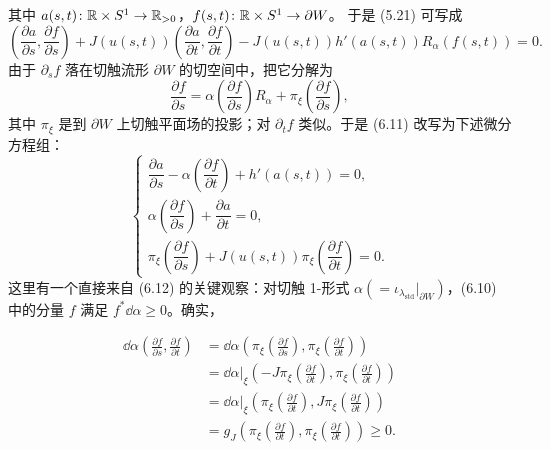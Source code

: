 其中 $a(s,t)\colon\mathbb{R}\times S^1\to\mathbb{R}_{>0}$，$f(s,t)\colon\mathbb{R}\times S^1\to\partial W$。
于是 (5.21) 可写成
\begin{equation}\tag{6.11}
  \left(\frac{\partial a}{\partial s},\frac{\partial f}{\partial s}\right)
  +J(u(s,t))\left(\frac{\partial a}{\partial t},\frac{\partial f}{\partial t}\right)
  -J(u(s,t))h'(a(s,t))R_\alpha(f(s,t))=0.
\end{equation}
由于 $\partial_s f$ 落在切触流形 $\partial W$ 的切空间中，把它分解为
\[
  \frac{\partial f}{\partial s}
  =\alpha\left(\frac{\partial f}{\partial s}\right)R_\alpha
  +\pi_\xi\left(\frac{\partial f}{\partial s}\right),
\]
其中 $\pi_\xi$ 是到 $\partial W$ 上切触平面场的投影；对 $\partial_t f$ 类似。于是
(6.11) 改写为下述微分方程组：
\begin{equation}\tag{6.12}
  \begin{cases}
    \dfrac{\partial a}{\partial s}
    -\alpha\left(\dfrac{\partial f}{\partial t}\right)+h'(a(s,t))=0,\\[8pt]
    \alpha\left(\dfrac{\partial f}{\partial s}\right)
    +\dfrac{\partial a}{\partial t}=0,\\[8pt]
    \pi_\xi\left(\dfrac{\partial f}{\partial s}\right)
    +J(u(s,t))\pi_\xi\left(\dfrac{\partial f}{\partial t}\right)=0.
  \end{cases}
\end{equation}
这里有一个直接来自 (6.12) 的关键观察：对切触 1-形式
$\alpha(=\iota_{\lambda_{\mathrm{std}}}|_{\partial W})$，(6.10) 中的分量 $f$ 满足
$f^*\dd\alpha\ge0$。确实，

\begin{align*}
  \dd\alpha\left(\frac{\partial f}{\partial s},\frac{\partial f}{\partial t}\right)
  &=\dd\alpha\left(\pi_\xi\left(\frac{\partial f}{\partial s}\right),
    \pi_\xi\left(\frac{\partial f}{\partial t}\right)\right)\\
  &=\dd\alpha|_\xi\left(-J\pi_\xi\left(\frac{\partial f}{\partial t}\right),
    \pi_\xi\left(\frac{\partial f}{\partial t}\right)\right)\\
  &=\dd\alpha|_\xi\left(\pi_\xi\left(\frac{\partial f}{\partial t}\right),
    J\pi_\xi\left(\frac{\partial f}{\partial t}\right)\right)\\
  &=g_J\left(\pi_\xi\left(\frac{\partial f}{\partial t}\right),
    \pi_\xi\left(\frac{\partial f}{\partial t}\right)\right)\ge0.
\end{align*}

